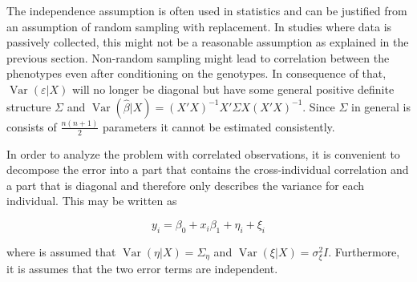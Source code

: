 \documentclass[final,leqno]{siamltex1213}
\DeclareMathOperator{\Var}{Var}
\begin{document}
The independence assumption is often used in statistics and can be justified from an assumption of random sampling with replacement. In studies where data is passively collected, this might not be a reasonable assumption as explained in the previous section. Non-random sampling might lead to correlation between the phenotypes even after conditioning on the genotypes. In consequence of that, $\Var(\varepsilon|X)$ will no longer be diagonal but have some general positive definite structure $\Sigma$ and $\Var(\hat{\beta}|X)=(X'X)^{-1}X'\Sigma X(X'X)^{-1}$. Since $\Sigma$ in general is consists of $\frac{n(n+1)}{2}$ parameters it cannot be estimated consistently.

In order to analyze the problem with correlated observations, it is convenient to decompose the error into a part that contains the cross-individual correlation and a part that is diagonal and therefore only describes the variance for each individual. This may be written as

\begin{equation*}
    y_i = \beta_0 + x_i\beta_1 + \eta_i + \xi_i
\end{equation*}

where is assumed that $\Var(\eta|X)=\Sigma_\eta$ and $\Var(\xi|X)=\sigma^2_\xi I$. Furthermore, it is assumes that the two error terms are independent.
\end{document}
